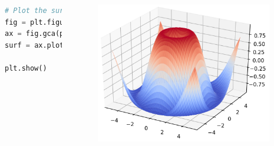 \begin{frame}[fragile]
\begin{columns}
{\begin{lstlisting}[language=python]
# Plot the surface
fig = plt.figure()
ax = fig.gca(projection='3d')
surf = ax.plot_surface(X, Y, Z, 
                       cmap=cm.coolwarm)
plt.show()\end{lstlisting}
}
%
\begin{figure}[htbp] 
   \includegraphics[width=0.95\textwidth]{figures/sin3D.png} 
\end{figure}
%
\end{columns}

\end{frame}